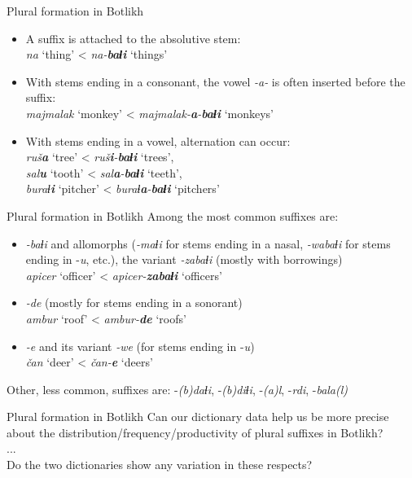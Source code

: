 \begin{frame}{Plural formation in Botlikh}
\begin{itemize}
    \item A suffix is attached to the absolutive stem: \\ \textit{na} `thing' < \textit{na-\textbf{baɬi}} `things'
    \item With stems ending in a consonant, the vowel \textit{-a-} is often inserted before the suffix: \\ \textit{majmalak}  `monkey' < \textit{majmalak-\textbf{a}-\textbf{baɬi}} `monkeys'
    \item With stems ending in a vowel, alternation can occur: \\ \textit{ruš\textbf{a}}  `tree' < \textit{ruš\textbf{i}-\textbf{baɬi}} `trees', \\ \textit{sal\textbf{u}}  `tooth' < \textit{sal\textbf{a}-\textbf{baɬi}} `teeth', \\ \textit{buraɬ\textbf{i}}  `pitcher' < \textit{buraɬ\textbf{a}-\textbf{baɬi}} `pitchers'
\end{itemize}
\end{frame}

\begin{frame}{Plural formation in Botlikh}
Among the most common suffixes are:
\begin{itemize}
    \item \textit{-baɬi} and allomorphs (\textit{-maɬi} for stems ending in a nasal, \textit{-wabaɬi} for stems ending in -\textit{u}, etc.), the variant \textit{-zabaɬi} (mostly with borrowings) \\ \textit{apicer} `officer' < \textit{apicer-\textbf{zabaɬi}} `officers'  
    \item \textit{-de} (mostly for stems ending in a sonorant) \\ \textit{ambur} `roof' < \textit{ambur-\textbf{de}} `roofs'
    \item \textit{-e} and its variant \textit{-we} (for stems ending in -\textit{u}) \\ \textit{čan} `deer' < \textit{čan-\textbf{e}} `deers'
\end{itemize}
Other, less common, suffixes are: -\textit{(b)daɬi}, -\textit{(b)diɬi}, -\textit{(a)l}, -\textit{rdi}, -\textit{bala(l)}
\end{frame}

\begin{frame}{Plural formation in Botlikh}
\centering
Can our dictionary data help us be more precise about the distribution/frequency/productivity of plural suffixes in Botlikh? \\ ... \\ Do the two dictionaries show any variation in these respects?
\end{frame}

